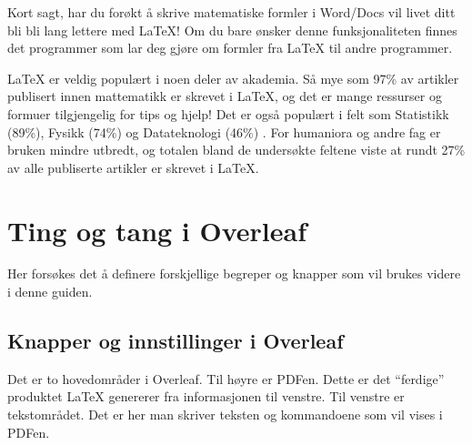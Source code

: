         Kort sagt, har du forøkt å skrive matematiske formler i Word/Docs vil livet ditt bli bli lang lettere med \LaTeX!
        Om du bare ønsker denne funksjonaliteten finnes det programmer som lar deg gjøre om formler fra \LaTeX{} til andre programmer.
        
        \LaTeX{} er veldig populært i noen deler av akademia. Så mye som 97\% av artikler publisert innen mattematikk er skrevet i \LaTeX{}, og det er mange ressurser og formuer tilgjengelig for tips og hjelp!
        Det er også populært i felt som Statistikk (89\%), Fysikk (74\%) og Datateknologi (46\%) \cite{brischoux2009don}. For humaniora og andre fag er bruken mindre utbredt, og totalen bland de undersøkte feltene viste at rundt 27\% av alle publiserte artikler er skrevet i \LaTeX. 
    
\section{Ting og tang i Overleaf}
    Her forsøkes det å definere forskjellige begreper og knapper som vil brukes videre i denne guiden.
    
    \subsection{Knapper og innstillinger i Overleaf}
        Det er to hovedområder i Overleaf. Til høyre er PDFen. Dette er det ``ferdige'' produktet \LaTeX{} genererer fra informasjonen til venstre. Til venstre er tekstområdet. Det er her man skriver teksten og kommandoene som vil vises i PDFen.
        
